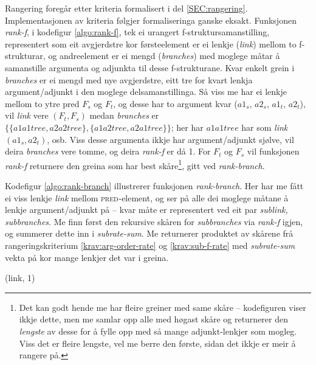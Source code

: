 \documentclass[12pt,a4paper,oneside,draft]{report}
\newcommand{\F}[2]{\textsc{#1}\ensuremath{_{#2}}}
\newcommand{\PRED}{\F{pred}{}}
\begin{document}
 Rangering foregår etter kriteria formalisert i del
 \ref{SEC:rangering}. Implementasjonen av kriteria følgjer
 formaliseringa ganske eksakt. Funksjonen \emph{rank-f}, i kodefigur
 \ref{algo:rank-f}, tek ei urangert f-struktursamanstilling,
 representert som eit avgjerdstre kor førsteelement er ei lenkje
 (\emph{link}) mellom to f-strukturar, og andreelement er ei mengd
 (\emph{branches}) med moglege måtar å samanstille argumenta og adjunkta
 til desse f-strukturane. Kvar enkelt grein i \emph{branches} er ei mengd
 med nye avgjerdstre, eitt tre for kvart lenkja argument/adjunkt i den
 moglege delsamanstillinga. Så viss me har ei lenkje mellom to ytre
 pred $F_s$ og $F_t$, og desse har to argument kvar ($a1_s$, $a2_s$,
 $a1_t$, $a2_t$), vil \emph{link} vere $(F_t,F_s)$ medan \emph{branches} er $\{
 \{ a1a1tree, a2a2tree \}, \{ a1a2tree, a2a1tree \} \}$; her har
 $a1a1tree$ har som \emph{link} $(a1_s, a2_t)$, osb. Viss desse argumenta
 ikkje har argument/adjunkt sjølve, vil deira \emph{branches} vere tomme,
 og deira \emph{rank-f} er då 1. For $F_t$ og $F_s$ vil funksjonen \emph{rank-f}
 returnere den greina som har best skåre\footnote{Det kan godt hende me har fleire greiner med same skåre --
        kodefiguren viser ikkje dette, men me samlar opp alle med
        høgast skåre og returnerer den \emph{lengste} av desse for å fylle
        opp med så mange adjunkt-lenkjer som mogleg. Viss det er
        fleire lengste, vel me berre den første, sidan det ikkje er
        meir å rangere på. }, gitt ved
 \emph{rank-branch}.

 Kodefigur \ref{algo:rank-branch} illustrerer funksjonen
 \emph{rank-branch}. Her har me fått ei viss lenkje \emph{link} mellom
 \PRED{}-element, og ser på alle dei moglege måtane å lenkje
 argument/adjunkt på -- kvar måte er representert ved eit par
 \emph{sublink, subbranches}. Me finn først den rekursive skåren for
 \emph{subbranches} via \emph{rank-f} igjen, og summerer dette inn i
 \emph{subrate-sum}. Me returnerer produktet av skårene frå
 rangeringskriterium \ref{krav:arg-order-rate} og
 \ref{krav:sub-f-rate} med \emph{subrate-sum} vekta på kor mange lenkjer
 det var i greina.

     \begin{algorithm}[]
      \caption{rank-f(seen, link, branches)}
      \label{algo:rank-f}

       {\Return (link, 1)}
      \end{algorithm}
\end{document}
